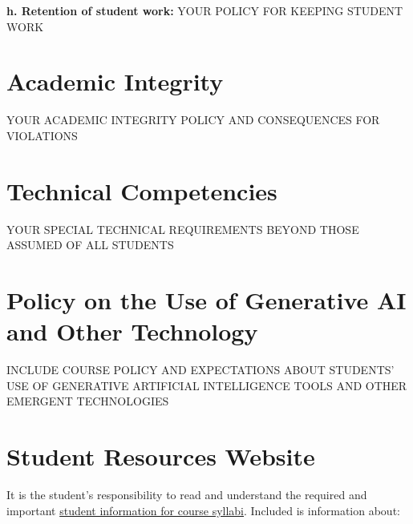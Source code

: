 \documentclass[12pt]{article}     %
\begin{document}
\vspace{1em}
\noindent \textbf{h. Retention of student work:}
YOUR POLICY FOR KEEPING STUDENT WORK


\section*{Academic Integrity}
YOUR ACADEMIC INTEGRITY POLICY AND CONSEQUENCES FOR VIOLATIONS

\section*{Technical Competencies}
YOUR SPECIAL TECHNICAL REQUIREMENTS BEYOND THOSE ASSUMED OF ALL STUDENTS

\section*{Policy on the Use of Generative AI and Other Technology}
INCLUDE COURSE POLICY AND EXPECTATIONS ABOUT STUDENTS' USE OF GENERATIVE ARTIFICIAL INTELLIGENCE TOOLS AND OTHER EMERGENT TECHNOLOGIES

\section*{Student Resources Website}
It is the student's responsibility to read and understand the required and important \href{https://fdc.fullerton.edu/teaching/student-info-syllabi.html}{student information for course syllabi}. Included is information about:
\end{document}
